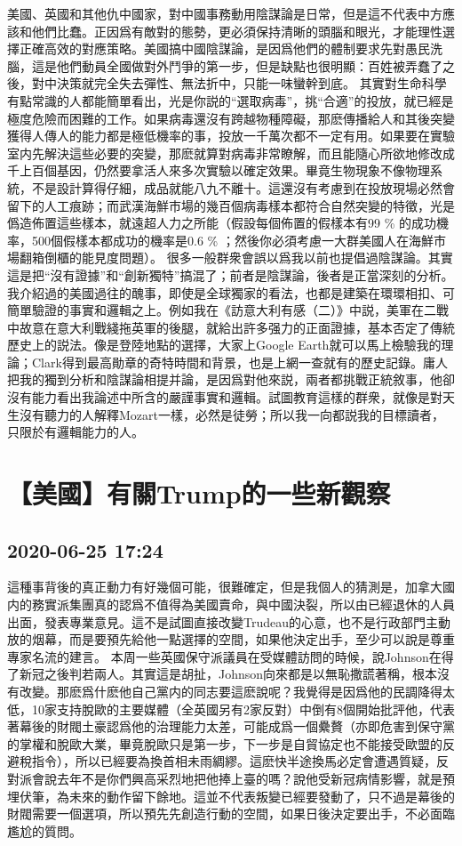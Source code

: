 \documentclass[twocolumn]{ctexart}
\begin{document}
美國、英國和其他仇中國家，對中國事務動用陰謀論是日常，但是這不代表中方應該和他們比蠢。正因爲有敵對的態勢，更必須保持清晰的頭腦和眼光，才能理性選擇正確高效的對應策略。美國搞中國陰謀論，是因爲他們的體制要求先對愚民洗腦，這是他們動員全國做對外鬥爭的第一步，但是缺點也很明顯：百姓被弄蠢了之後，對中決策就完全失去彈性、無法折中，只能一味蠻幹到底。
其實對生命科學有點常識的人都能簡單看出，光是你説的“選取病毒”，挑“合適”的投放，就已經是極度危險而困難的工作。如果病毒還沒有跨越物種障礙，那麽傳播給人和其後突變獲得人傳人的能力都是極低機率的事，投放一千萬次都不一定有用。如果要在實驗室内先解決這些必要的突變，那麽就算對病毒非常瞭解，而且能隨心所欲地修改成千上百個基因，仍然要拿活人來多次實驗以確定效果。畢竟生物現象不像物理系統，不是設計算得仔細，成品就能八九不離十。這還沒有考慮到在投放現場必然會留下的人工痕跡；而武漢海鮮市場的幾百個病毒樣本都符合自然突變的特徵，光是僞造佈置這些樣本，就遠超人力之所能（假設每個佈置的假樣本有99 \% 的成功機率，500個假樣本都成功的機率是0.6 \% ；然後你必須考慮一大群美國人在海鮮市場翻箱倒櫃的能見度問題）。
很多一般群衆會誤以爲我以前也提倡過陰謀論。其實這是把“沒有證據”和“創新獨特”搞混了；前者是陰謀論，後者是正當深刻的分析。我介紹過的美國過往的醜事，即使是全球獨家的看法，也都是建築在環環相扣、可簡單驗證的事實和邏輯之上。例如我在《訪意大利有感（二）》中説，美軍在二戰中故意在意大利戰綫拖英軍的後腿，就給出許多强力的正面證據，基本否定了傳統歷史上的説法。像是登陸地點的選擇，大家上Google Earth就可以馬上檢驗我的理論；Clark得到最高勛章的奇特時間和背景，也是上網一查就有的歷史記錄。庸人把我的獨到分析和陰謀論相提并論，是因爲對他來説，兩者都挑戰正統敘事，他卻沒有能力看出我論述中所含的嚴謹事實和邏輯。試圖教育這樣的群衆，就像是對天生沒有聽力的人解釋Mozart一樣，必然是徒勞；所以我一向都説我的目標讀者，只限於有邏輯能力的人。
\section*{【美國】有關Trump的一些新觀察}
\subsection*{2020-06-25 17:24}

這種事背後的真正動力有好幾個可能，很難確定，但是我個人的猜測是，加拿大國内的務實派集團真的認爲不值得為美國賣命，與中國決裂，所以由已經退休的人員出面，發表專業意見。這不是試圖直接改變Trudeau的心意，也不是行政部門主動放的烟幕，而是要預先給他一點選擇的空間，如果他決定出手，至少可以說是尊重專家名流的建言。
本周一些英國保守派議員在受媒體訪問的時候，說Johnson在得了新冠之後判若兩人。其實這是胡扯，Johnson向來都是以無恥撒謊著稱，根本沒有改變。那麽爲什麽他自己黨内的同志要這麽說呢？我覺得是因爲他的民調降得太低，10家支持脫歐的主要媒體（全英國另有2家反對）中倒有8個開始批評他，代表著幕後的財閥土豪認爲他的治理能力太差，可能成爲一個纍贅（亦即危害到保守黨的掌權和脫歐大業，畢竟脫歐只是第一步，下一步是自貿協定也不能接受歐盟的反避稅指令），所以已經要為換首相未雨綢繆。這麽快半途換馬必定會遭遇質疑，反對派會說去年不是你們興高采烈地把他捧上臺的嗎？說他受新冠病情影響，就是預埋伏筆，為未來的動作留下餘地。這並不代表叛變已經要發動了，只不過是幕後的財閥需要一個選項，所以預先先創造行動的空間，如果日後決定要出手，不必面臨尷尬的質問。
\end{document}
